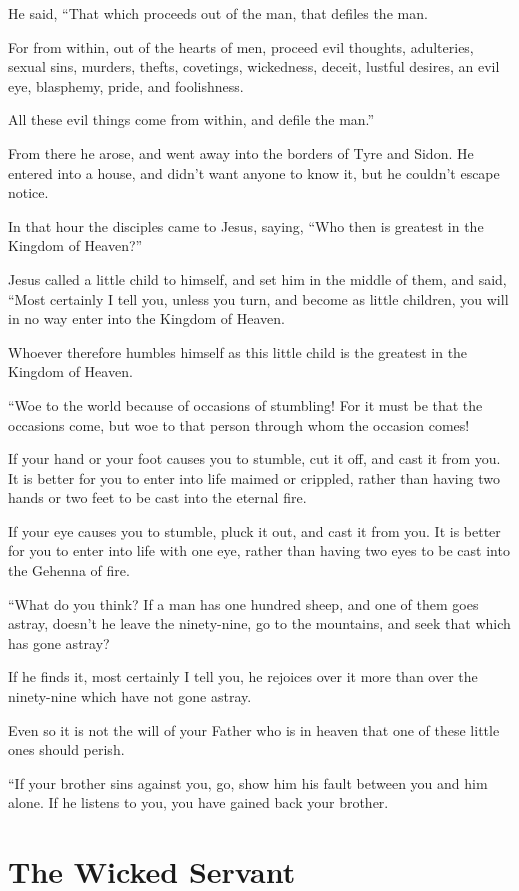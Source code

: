 He said, “That which proceeds out of the man, that defiles the man.

For from within, out of the hearts of men, proceed evil thoughts, adulteries, sexual sins, murders, thefts, covetings, wickedness, deceit, lustful desires, an evil eye, blasphemy, pride, and foolishness.

All these evil things come from within, and defile the man.”

From there he arose, and went away into the borders of Tyre and Sidon. He entered into a house, and didn’t want anyone to know it, but he couldn’t escape notice.

In that hour the disciples came to Jesus, saying, “Who then is greatest in the Kingdom of Heaven?”

Jesus called a little child to himself, and set him in the middle of them, and said, “Most certainly I tell you, unless you turn, and become as little children, you will in no way enter into the Kingdom of Heaven.

Whoever therefore humbles himself as this little child is the greatest in the Kingdom of Heaven.

“Woe to the world because of occasions of stumbling! For it must be that the occasions come, but woe to that person through whom the occasion comes!

If your hand or your foot causes you to stumble, cut it off, and cast it from you. It is better for you to enter into life maimed or crippled, rather than having two hands or two feet to be cast into the eternal fire.

If your eye causes you to stumble, pluck it out, and cast it from you. It is better for you to enter into life with one eye, rather than having two eyes to be cast into the Gehenna of fire.

“What do you think? If a man has one hundred sheep, and one of them goes astray, doesn’t he leave the ninety-nine, go to the mountains, and seek that which has gone astray?

If he finds it, most certainly I tell you, he rejoices over it more than over the ninety-nine which have not gone astray.

Even so it is not the will of your Father who is in heaven that one of these little ones should perish.

“If your brother sins against you, go, show him his fault between you and him alone. If he listens to you, you have gained back your brother.


\clearpage \section*{The Wicked Servant}

